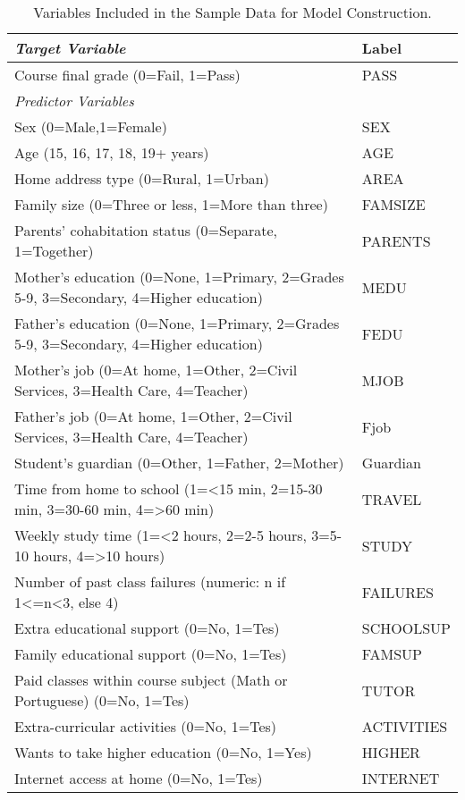 \documentclass[sigconf]{acmart}
\begin{document}
\begin{table*}[ht]
  \caption{Variables Included in the Sample Data for Model Construction.}
  \label{tab:freq}
  \begin{tabular}{ll}
    \toprule
    \textit{Target Variable} & Label \\
    \midrule
    Course final grade (0=Fail, 1=Pass) & PASS \\
    \midrule    
    \textit{Predictor Variables} &    \\
    \midrule
    Sex (0=Male,1=Female) & SEX  \\  
    Age (15, 16, 17, 18, 19+ years) & AGE  \\
    Home address type (0=Rural, 1=Urban) & AREA  \\
    Family size (0=Three or less, 1=More than three) & FAMSIZE  \\
    Parents' cohabitation status (0=Separate, 1=Together) & PARENTS  \\ 
    Mother's education (0=None, 1=Primary, 2=Grades 5-9,  3=Secondary, 4=Higher education) & MEDU  \\
    Father's education (0=None, 1=Primary, 2=Grades 5-9,  3=Secondary, 4=Higher education) & FEDU  \\
    Mother's job (0=At home, 1=Other, 2=Civil Services, 3=Health Care, 4=Teacher) & MJOB  \\
    Father's job (0=At home, 1=Other, 2=Civil Services, 3=Health Care, 4=Teacher) & Fjob  \\
    Student's guardian (0=Other, 1=Father, 2=Mother) & Guardian  \\
    Time from home to school (1=<15 min, 2=15-30 min, 3=30-60 min, 4=>60 min) & TRAVEL  \\
    Weekly study time (1=<2 hours, 2=2-5 hours, 3=5-10 hours, 4=>10 hours) & STUDY  \\
    Number of past class failures (numeric: n if 1<=n<3, else 4) & FAILURES  \\
    Extra educational support (0=No, 1=Tes) & SCHOOLSUP  \\
    Family educational support (0=No, 1=Tes) & FAMSUP  \\
    Paid classes within course subject (Math or Portuguese) (0=No, 1=Tes) & TUTOR  \\
    Extra-curricular activities (0=No, 1=Tes) & ACTIVITIES  \\
    Wants to take higher education (0=No, 1=Yes) & HIGHER  \\
    Internet access at home (0=No, 1=Tes) & INTERNET  \\

\end{tabular}
\end{table*}
\end{document}
